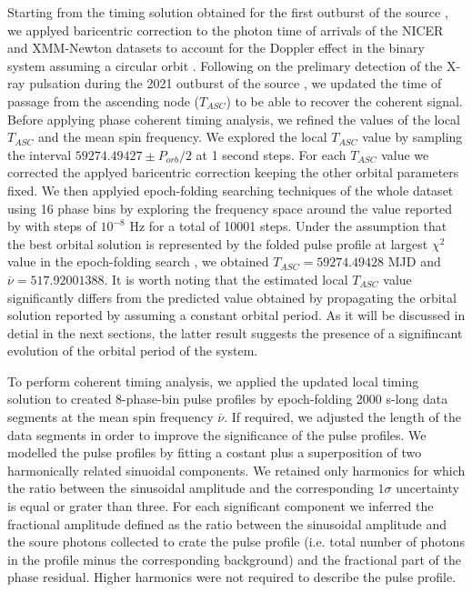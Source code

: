 \documentclass[fleqn,usenatbib]{mnras}
\newcommand{\nicer}{NICER}
\newcommand{\xmm}{XMM-Newton}
\begin{document}
Starting from the timing solution obtained for the first outburst of the source \citep{Markwardt:2010tl}, we applyed baricentric correction to the photon time of arrivals of the \nicer{} and \xmm{} datasets to account for the Doppler effect in the binary system assuming a circular orbit \citep[see e.g.][for a detailed description of the method]{Burderi:2007tl,Sanna:2016ty}. Following on the prelimary detection of the X-ray pulsation during the 2021 outburst of the source \citep{Bult:2021wk}, we updated the time of passage from the ascending node ($T_{ASC}$) to be able to recover the coherent signal. Before applying phase coherent timing analysis, we refined the values of the local $T_{ASC}$ and the mean spin frequency. We explored the local $T_{ASC}$ value by sampling the interval $59274.49427\pm P_{orb}/2$ at 1 second steps. For each $T_{ASC}$ value we corrected the applyed baricentric correction keeping the other orbital parameters fixed. We then applyied epoch-folding searching techniques of the whole dataset using 16 phase bins by exploring the frequency space around the value reported by \citet{Bult:2021wk} with steps of $10^{-8}$ Hz for a total of 10001 steps. Under the assumption that the best orbital solution is represented by the folded pulse profile at largest $\chi^2$ value in the epoch-folding search \citep[see
e.g.][]{Kirsch:2004tg}, we obtained $T_{ASC}=59274.49428$ MJD and $\overline{\nu}=517.92001388$.
It is worth noting that the estimated local $T_{ASC}$ value significantly differs from the predicted value obtained by propagating the orbital solution reported by \citep{Markwardt:2010tl} assuming a constant orbital period. As it will be discussed in detial in the next sections, the latter result suggests the presence of a signifincant evolution of the orbital period of the system.

To perform coherent timing analysis, we applied the updated local timing solution to created 8-phase-bin pulse profiles by epoch-folding 2000 s-long data segments at the mean spin frequency $\overline{\nu}$. If required, we adjusted the length of the data segments in order to improve the significance of the pulse profiles. We modelled the pulse profiles by fitting a costant plus a superposition of two harmonically related sinuoidal components. We retained only harmonics for which the ratio between the sinusoidal amplitude and the corresponding $1\sigma$ uncertainty is equal or grater than three. For each significant component we inferred the fractional amplitude defined as the ratio between the sinusoidal amplitude and the soure photons collected to crate the pulse profile (i.e. total number of photons in the profile minus the corresponding background) and the fractional part of the phase residual. Higher harmonics were not required to describe the pulse profile.
\end{document}
